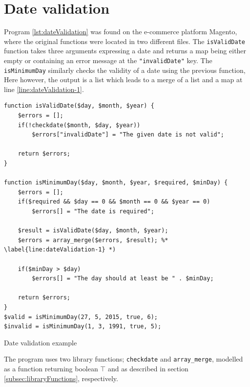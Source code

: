 \newpage
\section{Date validation}
Program \ref{lst:dateValidation} was found on the e-commerce platform Magento, where the original functions were located in two different files. The \texttt{isValidDate} function takes three arguments expressing a date and returns a map being either empty or containing an error message at the \texttt{"invalidDate"} key.  The \texttt{isMinimumDay} similarly checks the validity of a date using the previous function, Here however, the output is a list which leads to a merge of a list and a map at line \ref{line:dateValidation-1}. 

\begin{program}
\begin{lstlisting}
function isValidDate($day, $month, $year) {
    $errors = [];
    if(!checkdate($month, $day, $year))
        $errors["invalidDate"] = "The given date is not valid";

    return $errors;
}

function isMinimumDay($day, $month, $year, $required, $minDay) {
    $errors = [];
    if($required && $day == 0 && $month == 0 && $year == 0)
        $errors[] = "The date is required";

    $result = isValidDate($day, $month, $year);
    $errors = array_merge($errors, $result); %* \label{line:dateValidation-1} *)

    if($minDay > $day)
        $errors[] = "The day should at least be " . $minDay;

    return $errors;
}
$valid = isMinimumDay(27, 5, 2015, true, 6);
$invalid = isMinimumDay(1, 3, 1991, true, 5);
\end{lstlisting}
\caption{Date validation example}
\label{lst:dateValidation}
\end{program}

The program uses two library functions; \texttt{checkdate} and \texttt{array\_merge}, modelled as a function returning boolean $\top$ and as described in section \ref{subsec:libraryFunctions}, respectively.





